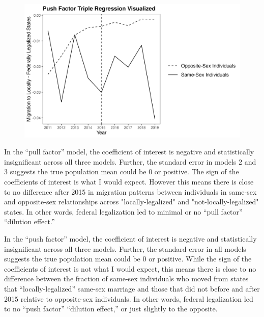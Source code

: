 \documentclass[12pt,letterpaper]{article}
\begin{document}
\begin{figure}[h]
    \centering
    \includegraphics[width=0.75\linewidth]{outputs/summary_stats/ante_diffs.png}
    \caption{}
    \label{fig: ante_diffs}
\end{figure}

In the “pull factor” model, the coefficient of interest is negative and statistically insignificant across all three models. Further, the standard error in models 2 and 3 suggests the true population mean could be 0 or positive. The sign of the coefficients of interest is what I would expect. However this means there is close to no difference after 2015 in migration patterns between individuals in same-sex and opposite-sex relationships across "locally-legalized" and "not-locally-legalized" states. In other words, federal legalization led to minimal or no “pull factor” “dilution effect.” 

In the “push factor” model, the coefficient of interest is negative and statistically insignificant across all three models. Further, the standard error in all models suggests the true population mean could be 0 or positive. While the sign of the coefficients of interest is not what I would expect, this means there is close to no difference between the fraction of same-sex individuals who moved from states that “locally-legalized” same-sex marriage and those that did not before and after 2015 relative to opposite-sex individuals. In other words, federal legalization led to no “push factor” “dilution effect,” or just slightly to the opposite.  
\end{document}
